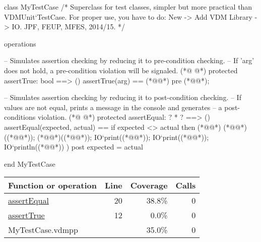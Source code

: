 \begin{vdmpp}[breaklines=true]
class MyTestCase
/*
  Superclass for test classes, simpler but more practical than VDMUnit`TestCase. 
  For proper use, you have to do: New -> Add VDM Library -> IO.
  JPF, FEUP, MFES, 2014/15.
*/

operations

 -- Simulates assertion checking by reducing it to pre-condition checking.
 -- If 'arg' does not hold, a pre-condition violation will be signaled.
(*@
\label{assertTrue:12}
@*)
 protected assertTrue: bool ==> ()
 assertTrue(arg) == 
  (*@@*) 
 pre (*@@*);
  
 -- Simulates assertion checking by reducing it to post-condition checking.
 -- If values are not equal, prints a message in the console and generates 
 -- a post-conditions violation.
(*@
\label{assertEqual:20}
@*)
 protected assertEqual: ? * ? ==> ()
 assertEqual(expected, actual) == 
  if expected <> actual then (*@\vdmnotcovered{(}@*)
     (*@@*)((*@@*));
     (*@@*)((*@@*)); 
     IO`print((*@@*));
     IO`print((*@@*));
     IO`println((*@@*))
  )
 post expected = actual
  
end MyTestCase
\end{vdmpp}
\bigskip
\begin{longtable}{|l|r|r|r|}
\hline
Function or operation & Line & Coverage & Calls \\
\hline
\hline
\hyperref[assertEqual:20]{assertEqual} & 20&38.8\% & 0 \\
\hline
\hyperref[assertTrue:12]{assertTrue} & 12&0.0\% & 0 \\
\hline
\hline
MyTestCase.vdmpp & & 35.0\% & 0 \\
\hline
\end{longtable}

